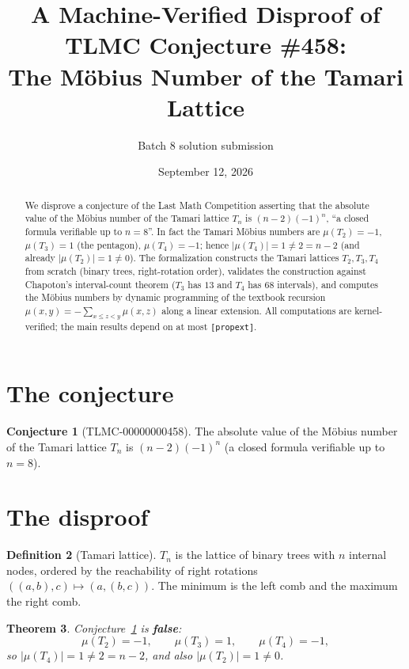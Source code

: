 \documentclass[11pt]{article}
\title{A Machine-Verified Disproof of TLMC Conjecture \#458:\\ The Möbius Number of the Tamari Lattice}
\author{Batch 8 solution submission}
\date{September 12, 2026}
\newtheorem{theorem}{Theorem}[section]
\theoremstyle{definition}
\newtheorem{definition}[theorem]{Definition}
\newtheorem{conjecture}[theorem]{Conjecture}
\theoremstyle{remark}
\begin{document}
\maketitle

\begin{abstract}
We disprove a conjecture of the Last Math Competition asserting that the absolute value of the Möbius number of the Tamari lattice $T_n$ is $(n-2)(-1)^n$, ``a closed formula verifiable up to $n = 8$''. In fact the Tamari Möbius numbers are $\mu(T_2) = -1$, $\mu(T_3) = 1$ (the pentagon), $\mu(T_4) = -1$; hence $|\mu(T_4)| = 1 \ne 2 = n - 2$ (and already $|\mu(T_2)| = 1 \ne 0$). The formalization constructs the Tamari lattices $T_2, T_3, T_4$ from scratch (binary trees, right-rotation order), validates the construction against Chapoton's interval-count theorem ($T_3$ has $13$ and $T_4$ has $68$ intervals), and computes the Möbius numbers by dynamic programming of the textbook recursion $\mu(x,y) = -\sum_{x \le z < y} \mu(x,z)$ along a linear extension. All computations are kernel-verified; the main results depend on at most \texttt{[propext]}.
\end{abstract}

\section{The conjecture}

\begin{conjecture}[TLMC-00000000458]\label{conj:458}
The absolute value of the Möbius number of the Tamari lattice $T_n$ is $(n-2)(-1)^n$ (a closed formula verifiable up to $n = 8$).
\end{conjecture}

\section{The disproof}

\begin{definition}[Tamari lattice]
$T_n$ is the lattice of binary trees with $n$ internal nodes, ordered by the reachability of right rotations $((a,b),c) \mapsto (a,(b,c))$. The minimum is the left comb and the maximum the right comb.
\end{definition}

\begin{theorem}\label{thm:458}
Conjecture~\ref{conj:458} is \textbf{false}:
\[
\mu(T_2) = -1, \qquad \mu(T_3) = 1, \qquad \mu(T_4) = -1,
\]
so $|\mu(T_4)| = 1 \ne 2 = n-2$, and also $|\mu(T_2)| = 1 \ne 0$.
\end{theorem}
\end{document}
